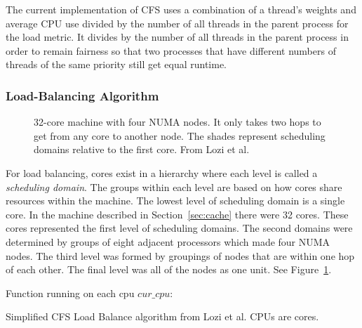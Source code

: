 \documentclass{sig-alternate}
\begin{document}
The current implementation of CFS uses a combination of a thread's weights and average CPU use divided by the number of all threads in the parent process for the load metric. It divides by the number of all threads in the parent process in order to remain fairness so that two processes that have different numbers of threads of the same priority still get equal runtime.~\cite{Lozi:2016}

\subsubsection{Load-Balancing Algorithm}
\label{sec:loadbalancealg}

\begin{figure}
\centering
{}
\caption{32-core machine with four NUMA nodes. It only takes two hops to get from any core to another node. The shades represent scheduling domains relative to the first core. From Lozi et al.~\cite{Lozi:2016}}
\label{fig:domains}
\end{figure}


For load balancing, cores exist in a hierarchy where each level is called a \emph{scheduling domain}. The groups within each level are based on how cores share resources within the machine. The lowest level of scheduling domain is a single core. In the machine described in Section~\ref{sec:cache} there were 32 cores. These cores represented the first level of scheduling domains. The second domains were determined by groups of eight adjacent processors which made four NUMA nodes. The third level was formed by groupings of nodes that are within one hop of each other. The final level was all of the nodes as one unit. See Figure~\ref{fig:domains}.~\cite{Lozi:2016}


{\SetAlgoNoLine%
\begin{algorithm}
\Indm\Indmm
Function running on each cpu $\textit{cur\_cpu:}$ \\
\Indp\Indpp
    \BlankLine
\label{fig:cfsloadbalancer}	
\caption{Simplified CFS Load Balance algorithm from Lozi et al. CPUs are cores.~\cite{Lozi:2016}}
\end{algorithm}
}
\end{document}

